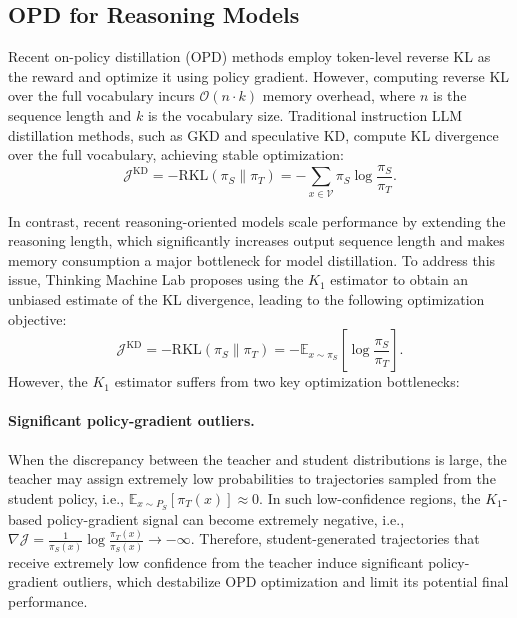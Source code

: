 \documentclass{article} %
\begin{document}
\subsection{OPD for Reasoning Models}





Recent on-policy distillation (OPD) methods employ token-level reverse KL as the reward and optimize it using policy gradient.
However, computing reverse KL over the full vocabulary incurs 
$\mathcal{O}(n \cdot k)$ memory overhead, where $n$ is the sequence length 
and $k$ is the vocabulary size. 
Traditional instruction LLM distillation methods, such as GKD and speculative KD, compute KL divergence over the full vocabulary, achieving stable optimization: 
\begin{equation}
\mathcal{J}^{\mathrm{KD}}
=
-\mathrm{RKL}(\pi_S \parallel \pi_T)
=
-\sum_{x \in \mathcal{V}}
\pi_S
\log \frac{\pi_S}{\pi_T}.
\end{equation}

In contrast, recent reasoning-oriented models scale performance by extending the reasoning length, which significantly increases output sequence length and makes memory consumption a major bottleneck for model distillation. To address this issue, Thinking Machine Lab proposes using the $K_1$ estimator to obtain an unbiased estimate of the KL divergence, leading to the following optimization objective:
\begin{equation}
\mathcal{J}^{\mathrm{KD}}
=
-\mathrm{RKL}(\pi_S \parallel \pi_T)
=
-\mathbb{E}_{x \sim \pi_S}
\left[
\log \frac{\pi_S}{\pi_T}
\right].
\end{equation}
However, the $K_1$ estimator suffers from two key optimization bottlenecks:

\paragraph{Significant policy-gradient outliers.}
When the discrepancy between the teacher and student distributions is large, the teacher may assign extremely low probabilities to trajectories sampled from the student policy, i.e., $\mathbb{E}_{x \sim P_S}\left[\pi_T(x)\right] \approx 0$. In such low-confidence regions, the $K_1$-based policy-gradient signal can become extremely negative, i.e., $\nabla \mathcal{J} = \frac{1}{\pi_S(x)} \log \frac{\pi_T(x)}{\pi_S(x)} \rightarrow -\infty$. Therefore, student-generated trajectories that receive extremely low confidence from the teacher induce significant policy-gradient outliers, which destabilize OPD optimization and limit its potential final performance.
\end{document}
